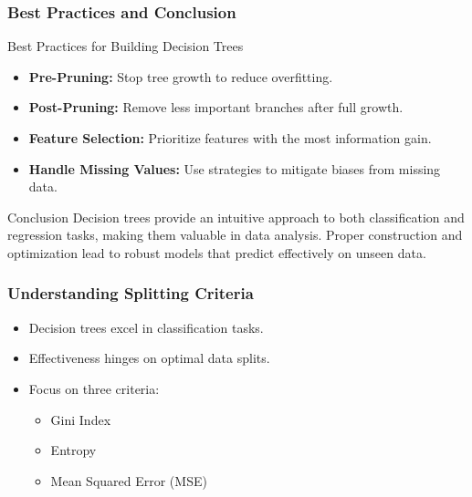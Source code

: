 \documentclass[aspectratio=169]{beamer}
\begin{document}
\begin{frame}[fragile]
    \frametitle{Best Practices and Conclusion}
    \begin{block}{Best Practices for Building Decision Trees}
        \begin{itemize}
            \item \textbf{Pre-Pruning:} Stop tree growth to reduce overfitting.
            \item \textbf{Post-Pruning:} Remove less important branches after full growth.
            \item \textbf{Feature Selection:} Prioritize features with the most information gain.
            \item \textbf{Handle Missing Values:} Use strategies to mitigate biases from missing data.
        \end{itemize}
    \end{block}

    \begin{block}{Conclusion}
        Decision trees provide an intuitive approach to both classification and regression tasks, making them valuable in data analysis. Proper construction and optimization lead to robust models that predict effectively on unseen data.
    \end{block}
\end{frame}

\begin{frame}[fragile]
    \frametitle{Understanding Splitting Criteria}
    \begin{itemize}
        \item Decision trees excel in classification tasks.
        \item Effectiveness hinges on optimal data splits.
        \item Focus on three criteria: 
        \begin{itemize}
            \item Gini Index
            \item Entropy
            \item Mean Squared Error (MSE)
        \end{itemize}
    \end{itemize}
\end{frame}
\end{document}
